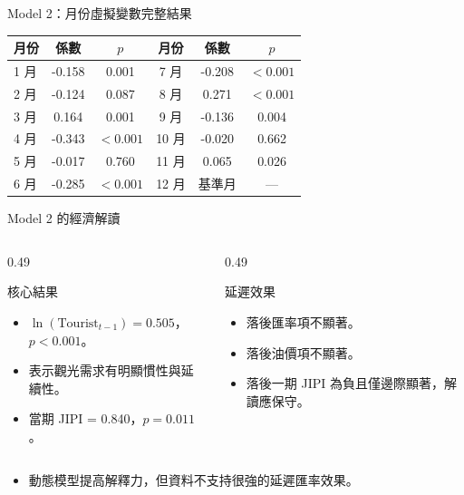\documentclass[aspectratio=169]{ctexbeamer}
\begin{document}
\begin{frame}{Model 2：月份虛擬變數完整結果}
\scriptsize
\begin{tabular}{lccccc}
\toprule
月份 & 係數 & $p$ & 月份 & 係數 & $p$ \\
\midrule
1 月 & -0.158 & 0.001 & 7 月 & -0.208 & $<0.001$ \\
2 月 & -0.124 & 0.087 & 8 月 & 0.271 & $<0.001$ \\
3 月 & 0.164 & 0.001 & 9 月 & -0.136 & 0.004 \\
4 月 & -0.343 & $<0.001$ & 10 月 & -0.020 & 0.662 \\
5 月 & -0.017 & 0.760 & 11 月 & 0.065 & 0.026 \\
6 月 & -0.285 & $<0.001$ & 12 月 & 基準月 & --- \\
\bottomrule
\end{tabular}
\end{frame}

\begin{frame}{Model 2 的經濟解讀}
\begin{columns}[T]
  \begin{column}{0.49\textwidth}
    \begin{block}{核心結果}
    \begin{itemize}
      \item $\ln(\mathrm{Tourist}_{t-1})=0.505$，$p<0.001$。
      \item 表示觀光需求有明顯慣性與延續性。
      \item 當期 JIPI = 0.840，$p=0.011$。
    \end{itemize}
    \end{block}
  \end{column}
  \begin{column}{0.49\textwidth}
    \begin{block}{延遲效果}
    \begin{itemize}
      \item 落後匯率項不顯著。
      \item 落後油價項不顯著。
      \item 落後一期 JIPI 為負且僅邊際顯著，解讀應保守。
    \end{itemize}
    \end{block}
  \end{column}
\end{columns}
\vspace{0.5em}
\begin{itemize}
  \item 動態模型提高解釋力，但資料不支持很強的延遲匯率效果。
\end{itemize}
\end{frame}
\end{document}
